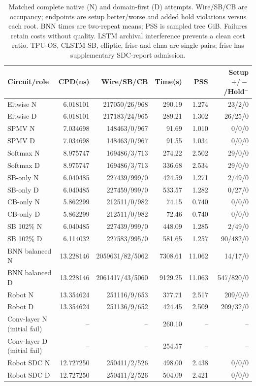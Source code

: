 \documentclass[conference,10pt]{IEEEtran}
\begin{document}
\begin{table}[t]
\centering\footnotesize\setlength{\tabcolsep}{3pt}
\caption{Matched complete native (N) and domain-first (D) attempts. Wire/SB/CB are occupancy; endpoints are setup better/worse and added hold violations versus each root. BNN times are two-repeat means; PSS is sampled tree GiB. Failures retain costs without quality. LSTM archival interference prevents a clean cost ratio. TPU-OS, CLSTM-SB, elliptic, frisc and clma are single pairs; frisc has supplementary SDC-report admission.}
\label{tab:completecost}
\begin{tabular}{lrrrrr}\hline
Circuit/role & CPD(ns) & Wire/SB/CB & Time(s) & PSS & Setup $+/-$/Hold$^-$\\\hline
Eltwise N&6.018101&217050/26/968&290.19&1.274&23/2/0\\
Eltwise D&6.018101&217183/24/965&289.21&1.302&26/25/0\\
SPMV N&7.034698&148463/0/967&91.69&1.010&0/0/0\\
SPMV D&7.034698&148463/0/967&91.55&1.034&0/0/0\\
Softmax N&8.975747&169486/3/713&274.22&2.502&29/0/0\\
Softmax D&8.975747&169486/3/713&336.68&2.534&29/0/0\\
SB-only N&6.040485&227439/999/0&424.59&1.271&2/49/0\\
SB-only D&6.040485&227459/999/0&533.57&1.282&0/27/0\\
CB-only N&5.862299&212511/0/982&74.15&0.740&0/0/0\\
CB-only D&5.862299&212511/0/982&72.46&0.740&0/0/0\\
SB 102\% N&6.040485&227439/999/0&448.09&1.285&2/49/0\\
SB 102\% D&6.114032&227583/995/0&581.65&1.257&90/482/0\\
BNN balanced N&13.228146&2059631/82/5062&7308.61&11.062&14/17/0\\
BNN balanced D&13.228146&2061417/43/5060&9129.25&11.063&547/820/0\\
Robot N&13.354624&251116/9/653&377.71&2.517&209/0/0\\
Robot D&13.354624&251136/9/652&424.45&2.509&209/32/0\\
Conv-layer N (initial fail)&--&--&260.10&--&--\\
Conv-layer D (initial fail)&--&--&254.57&--&--\\
Robot SDC N&12.727250&250411/2/526&498.00&2.438&0/0/0\\
Robot SDC D&12.727250&250411/2/526&504.09&2.421&0/0/0\\

\end{tabular}
\end{table}
\end{document}
